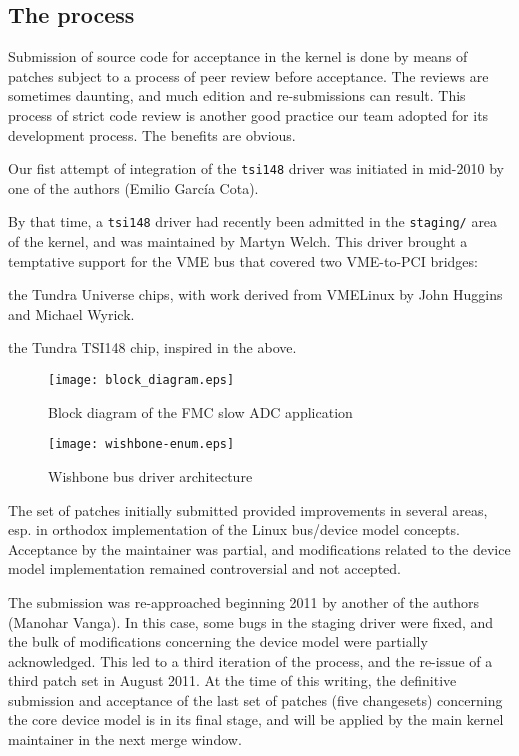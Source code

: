 \documentclass{JAC2003}
\begin{document}
\subsection{The process}

Submission of source code for acceptance in the kernel is done by means
of patches subject to a process of peer review before acceptance. The
reviews are sometimes daunting, and much edition and re-submissions can
result. This process of strict code review is another good practice our
team adopted for its development process. The benefits are obvious.

Our fist attempt of integration of the \verb|tsi148| driver
was initiated in mid-2010 by one of the authors (Emilio Garc\'ia
Cota). 

By that time, a \verb|tsi148| driver had recently been admitted in the
\texttt{staging/} area of the kernel, and was maintained by Martyn Welch. This
driver brought a temptative support for the VME bus that covered
two VME-to-PCI bridges:
\begin{Itemize}
\item the Tundra Universe chips, with work derived from VMELinux by John
Huggins and Michael Wyrick.
\item the Tundra TSI148 chip, inspired in the above.
\end{Itemize}

\begin{figure}[t]
   \centering
   \texttt{[image: block\_diagram.eps]}
   \caption{Block diagram of the FMC slow ADC application}
   \label{slow-adc}
\end{figure}

\begin{figure}[t]
   \centering
   \texttt{[image: wishbone-enum.eps]}
   \caption{Wishbone bus driver architecture}
   \label{wishbone-enum}
\end{figure}

The set of patches initially submitted provided improvements in several
areas, esp. in orthodox implementation of the Linux bus/device model
concepts.
Acceptance by the maintainer was partial, and modifications related to
the device model implementation remained controversial and not accepted.

The submission was re-approached beginning 2011 by another of the
authors (Manohar Vanga). In this case, some bugs in the staging driver
were fixed, and the bulk of modifications concerning the device model
were partially acknowledged. This led to a third iteration of the
process, and the re-issue of a third patch set in August 2011. At the
time of this writing, the definitive submission and acceptance of the
last set of patches (five changesets) concerning the core device model
is in its final stage, and will be applied by the main kernel maintainer
in the next merge window.
\end{document}
